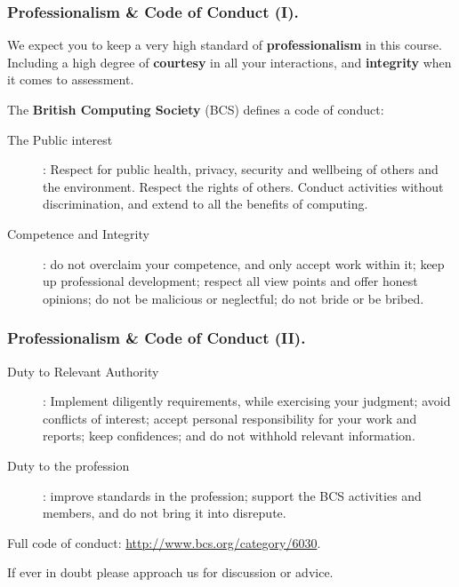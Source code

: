 \documentclass{beamer} %
\newcommand\emc[1]{\textcolor{brightblue}{\textbf{#1}}}
\begin{document}
\begin{frame}
\frametitle{Professionalism \& Code of Conduct (I).}

We expect you to keep a very high standard of \emc{professionalism} in this course. Including a high degree of \emc{courtesy} in all your interactions, and \emc{integrity} when it comes to assessment.

\vspace{3mm}
The \emc{British Computing Society} (BCS) defines a code of conduct:
\begin{description}
	\item[The Public interest]: Respect for public health, privacy, security and wellbeing of others and the environment. Respect the rights of others. Conduct activities without discrimination, and extend to all the benefits of computing.
	\item[Competence and Integrity]: do not overclaim your competence, and only accept work within it; keep up professional development; respect all view points and offer honest opinions; do not be malicious or neglectful; do not bride or be bribed.
\end{description}

\end{frame}

\begin{frame}
\frametitle{Professionalism \& Code of Conduct (II).}

\begin{description}
	\item[Duty to Relevant Authority]: Implement diligently requirements, while exercising your judgment; avoid conflicts of interest; accept personal responsibility for your work and reports; keep confidences; and do not withhold relevant information.
	\item[Duty to the profession]: improve standards in the profession; support the BCS activities and members, and do not bring it into disrepute.
\end{description}

\vspace{3mm}
Full code of conduct: \url{http://www.bcs.org/category/6030}.

\vspace{3mm}
If ever in doubt please approach us for discussion or advice.

\end{frame}




\end{document}
